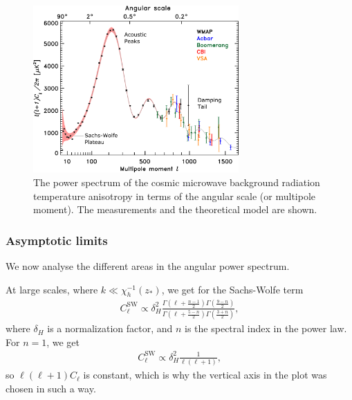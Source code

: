 \begin{figure}
	\centering
	\includegraphics[width=0.7\textwidth]{img/ch-03/power-spectrum.pdf}
	\caption{The power spectrum of the cosmic microwave background radiation temperature anisotropy in terms of the angular scale (or multipole moment). The measurements and the theoretical model are shown.}
	\label{fig:power-spectrum}
\end{figure}

\subsubsection{Asymptotic limits}
We now analyse the different areas in the angular power spectrum.

At large scales, where $k \ll \chi_h^{-1}(z_*)$, we get for the Sachs-Wolfe term
\begin{align*}
	C_\ell^\text{SW} \propto \delta_H^2 \frac{
	\Gamma\left(\ell+\frac{n-1}{2}\right)
	\Gamma\left(\frac{9-n}{2}\right) 
	}{
	\Gamma\left(\ell+\frac{5-n}{2}\right)
	\Gamma\left(\frac{3+n}{2}\right)
	},
\end{align*}
where $\delta_H$ is a normalization factor, and $n$ is the spectral index in the power law. For $n=1$, we get
\begin{align*}
	C_\ell^{\text{SW}} \propto \delta_H^2 \frac{1}{\ell(\ell+1)},
\end{align*}
so $\ell(\ell+1) C_\ell$ is constant, which is why the vertical axis in the plot was chosen in such a way.

